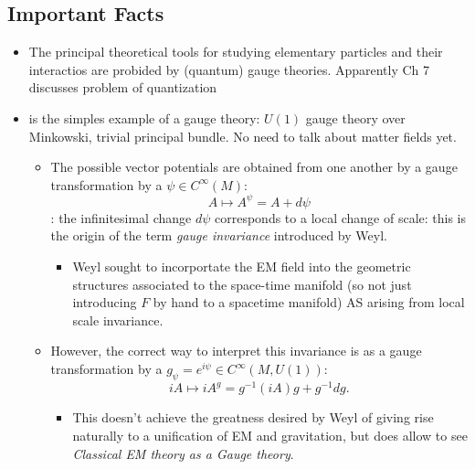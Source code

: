 \documentclass[12pt]{report}
\begin{document}
\subsection{Important Facts}
\begin{itemize}
    \item The principal theoretical tools for studying elementary particles and their interactios are probided by (quantum) gauge theories. Apparently Ch 7 discusses problem of quantization
    
    \item {} is the simples example of a gauge theory: $U(1)$ gauge theory over Minkowski, trivial principal bundle. No need to talk about matter fields yet.
    \begin{itemize}
        \item The possible vector potentials are obtained from one another by a gauge transformation by a $\psi \in C^\infty(M)$: \[A \mapsto A^\psi = A + d\psi\]: the infinitesimal change $d\psi$ corresponds to a local change of scale: this is the origin of the term \emph{gauge invariance} introduced by Weyl.
        \begin{itemize}
            \item Weyl sought to incorportate the EM field into the geometric structures associated to the space-time manifold (so not just introducing $F$ by hand to a spacetime manifold) AS arising from local scale invariance.
        \end{itemize}
        
        \item However, the correct way to interpret this invariance is as a gauge transformation by a $g_\psi = e^{i \psi} \in  C^\infty(M, U(1))$: \[iA \mapsto iA^g = g^{-1} (iA) g + g^{-1} dg.\]
        \begin{itemize}
            \item This doesn't achieve the greatness desired by Weyl of giving rise naturally to a unification of EM and gravitation, but does allow to see \emph{Classical EM theory as a Gauge theory}.
        \end{itemize}
    \end{itemize}
    

\end{itemize}
\end{document}
